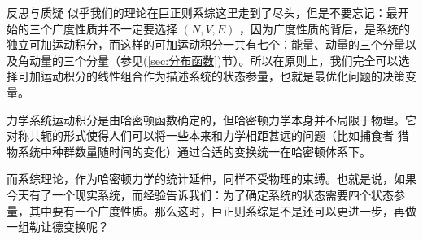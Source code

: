 \begin{justification}{\kaishu 反思与质疑}
\kaishu \fontsize{11pt}{16pt}
    \quad\quad 似乎我们的理论在巨正则系综这里走到了尽头，但是不要忘记：最开始的三个广度性质并不一定要选择 $(N,V,E)$ ，因为广度性质的背后，是系统的独立可加运动积分，而这样的可加运动积分一共有七个：能量、动量的三个分量以及角动量的三个分量（参见(\ref*{sec:分布函数})节）。所以在原则上，我们完全可以选择可加运动积分的线性组合作为描述系统的状态参量，也就是最优化问题的决策变量。

    \quad\quad 力学系统运动积分是由哈密顿函数确定的，但哈密顿力学本身并不局限于物理。它对称共轭的形式使得人们可以将一些本来和力学相距甚远的问题（比如捕食者-猎物系统中种群数量随时间的变化）通过合适的变换统一在哈密顿体系下。
    
    \quad\quad 而系综理论，作为哈密顿力学的统计延伸，同样不受物理的束缚。也就是说，如果今天有了一个现实系统，而经验告诉我们：为了确定系统的状态需要四个状态参量，其中要有一个广度性质。那么这时，巨正则系综是不是还可以更进一步，再做一组勒让德变换呢？
\end{justification}